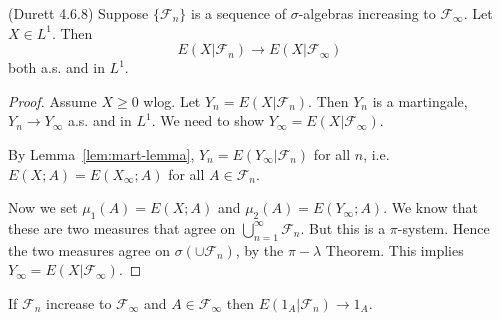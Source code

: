 \begin{theorem}
	(Durett 4.6.8)
	Suppose $\{\mathcal{F}_n\} $ is a sequence of $\sigma$-algebras increasing to $\mathcal{F}_\infty $. Let $X \in L^1$. Then
	\[
		E(X | \mathcal{F}_n ) \to  E(X | \mathcal{F}_\infty )
	\] 
	both a.s. and in $L^1$.
\end{theorem}
\begin{proof}
	Assume $X \ge 0$ wlog. Let $Y_n = E(X | \mathcal{F}_n)$. Then $Y_n$ is a martingale, $Y_n \to  Y_\infty $ a.s. and in $L^1$. We need to show $Y_\infty  = E(X | \mathcal{F}_\infty )$.

	By Lemma~\ref{lem:mart-lemma}, $Y_n = E(Y_\infty | \mathcal{F}_n)$ for all $n$, i.e. $E(X; A) = E(X_\infty ; A)$ for all $A \in \mathcal{F}_n$.
	
	Now we set $\mu_1(A) = E(X; A)$ and $\mu_2(A) = E(Y_\infty ; A)$. We know that these are two measures that agree on $\bigcup_{n = 1} ^\infty \mathcal{F}_n$. But this is a $\pi$-system. Hence the two measures agree on $\sigma\left( \cup \mathcal{F}_n \right) $, by the $\pi-\lambda$ Theorem.
	This implies $Y_\infty = E(X | \mathcal{F}_\infty )$.
\end{proof}

\begin{corollary}
	If $\mathcal{F}_n$ increase to  $\mathcal{F}_\infty $ and $A \in \mathcal{F}_\infty $ then $E(1_A | \mathcal{F}_n) \to 1_A$.
\end{corollary}




